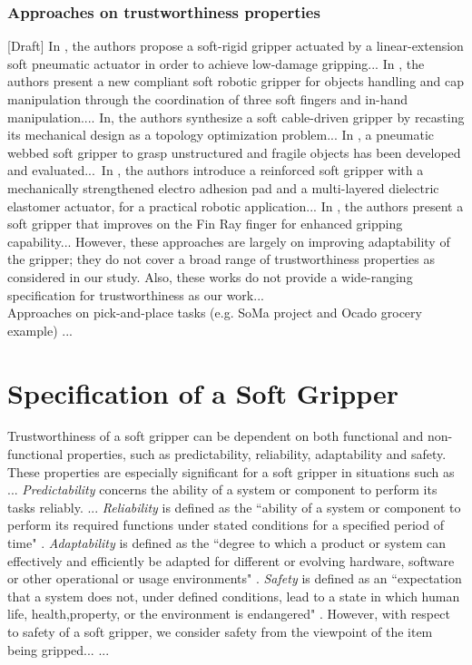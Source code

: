 \documentclass[lettersize,journal]{IEEEtran}
\begin{document}
\subsubsection{Approaches on trustworthiness properties}[Draft]
In \cite{Cheng2021}, the authors propose a soft-rigid gripper actuated by a linear-extension soft pneumatic actuator in order to achieve low-damage gripping... In \cite{Liu2021}, the authors present a new compliant soft robotic gripper for objects handling and cap manipulation through the coordination of three soft fingers and in-hand manipulation.... In\cite{Chen2018}, the authors synthesize a soft cable-driven gripper by recasting its mechanical design as a topology optimization problem... In \cite{Cai2021}, a pneumatic webbed soft gripper to grasp unstructured and fragile objects has been developed and evaluated... In \cite{Hwang2020}, the authors introduce a reinforced soft gripper with a mechanically strengthened electro adhesion pad and a multi-layered dielectric elastomer actuator, for a practical robotic application... In \cite{Shin2021}, the authors present a soft gripper that improves on the Fin Ray finger for enhanced gripping capability... However, these approaches are largely on improving adaptability of the gripper; they do not cover a broad range of trustworthiness properties as considered in our study. Also, these works do not provide a wide-ranging specification for trustworthiness as our work...\\

Approaches on pick-and-place tasks (e.g. SoMa project and Ocado grocery example) \cite{Negrello2020,Triantafyllou2019,Sotiropoulos2018, Pozzi2016,Bianchi2018}...

\section{Specification of a Soft Gripper}\label{specification-gripper}
Trustworthiness of a soft gripper can be dependent on both functional and non-functional properties, such as predictability, reliability, adaptability and safety. 
These properties are especially significant for a soft gripper in situations such as ...
\emph{Predictability} concerns the ability of a system or component to perform its tasks reliably. ...
\emph{Reliability} is defined as the ``ability of a system or component to perform its required functions under stated conditions for a specified period of time" \cite{ISO24765:2017}. 
\emph{Adaptability} is defined as the ``degree to which a product or system can effectively and efficiently be adapted for different or evolving hardware, software or other operational or usage environments" \cite{ISO24765:2017}. 
\emph{Safety} is defined as an ``expectation that a system does not, under defined conditions, lead to a state in which human life, health,property, or the environment is endangered" \cite{ISO24765:2017}. However, with respect to safety of a soft gripper, we consider safety from the viewpoint of the item being gripped...
...
\end{document}
